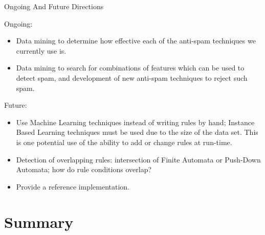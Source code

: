 \documentclass{beamer}
\newcommand{\timingnote}[1]{%
}
\begin{document}
\begin{frame}{Ongoing And Future Directions}

    \timingnote{1--2 minutes}

    Ongoing:

    \begin{itemize}

        \item Data mining to determine how effective each of the anti-spam
            techniques we currently use is.

        \item Data mining to search for combinations of features which can
            be used to detect spam, and development of new anti-spam
            techniques to reject such spam.

    \end{itemize}

    Future:

    \begin{itemize}

        \item Use Machine Learning techniques instead of writing rules by
            hand; Instance Based Learning techniques must be used due to
            the size of the data set.  This is one potential use of the
            ability to add or change rules at run-time.
            \timingnote{Compare to SLCT-based tool.}

        \item Detection of overlapping rules: intersection of Finite
            Automata or Push-Down Automata; how do rule conditions overlap?

        \item Provide a reference implementation.

    \end{itemize}

\end{frame}


\section{Summary}
\end{document}
